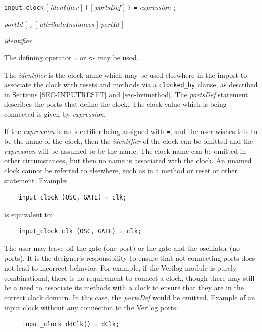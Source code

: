 \documentclass[twoside,letterpaper]{article}
\newcommand{\hm}{\hspace*{1em}}
\newcommand{\te}[1]{\texttt{#1}}
\newcommand{\nterm}[1]{\emph{#1}}
\newcommand{\term}[1]{\texttt{#1}}
\newcommand{\opt}[1]{[ #1 ]}
\newcommand{\gram}[2]{    \hm\makebox[10em][l]{\it #1}\makebox[1.5em][l]{::=}    #2}
\begin{document}
\gram{inputClockBVIStmt} {\term{input\_clock} \opt{\nterm{identifier}}
\term{(} \opt{\nterm{portsDef}} \term{)} \term{=} \nterm{expression} \term{;}}

\gram{portsDef}  {\nterm{portId}  \opt{\term{,} \opt{\nterm{attributeInstances}} \nterm{portId} }}

\gram{portId}    {\nterm{identifier}}

The defining operator \texttt{=} or \texttt{<-} may be used. 

The \nterm{identifier} is the clock name which may be used elsewhere
in the import to
associate the clock with resets and  methods  via a \te{clocked\_by}
clause, as described in Sections  \ref{SEC-INPUTRESET} and \ref{sec-bvimethod}.
The \nterm{portsDef} statement describes the ports that define the
clock.  The
clock value which is being connected is given by  \nterm{expression}.

If the \nterm{expression} is an identifier being assigned with
\term{=}, and the user wishes this to be the name of the clock, then
the \nterm{identifier} of the clock can be omitted and the \nterm{expression}
will be assumed to be the name.  The clock name can be omitted in
other circumstances, but then no name is associated with the clock. An
unamed clock cannot be referred to elsewhere, such as in a
method or reset or other statement.
Example:
\begin{verbatim}
    input_clock (OSC, GATE) = clk;
\end{verbatim}
is equivalent to:
\begin{verbatim}
    input_clock clk (OSC, GATE) = clk;
\end{verbatim}

The user may leave off the gate (one port) or the gate and the
oscillator (no ports).  
It is the designer's responsibility to ensure that not connecting
ports  does not lead to
incorrect behavior.  For example, if the Verilog module is purely
combinational, there is no requirement to connect a clock, though
there may still be a need to associate its methods with a clock to
ensure that they are in the correct clock domain.  In this case, the
\nterm{portsDef} would be omitted.
Example of an input clock without any connection to the Verilog ports:
\begin{verbatim}
     input_clock ddClk() = dClk;
\end{verbatim}
\end{document}

